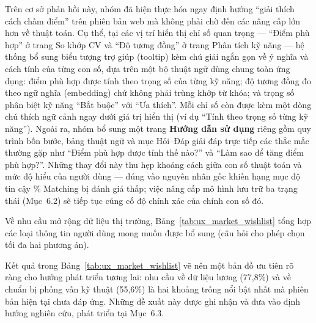 Trên cơ sở phản hồi này, nhóm đã hiện thực hóa ngay định hướng ``giải thích cách chấm điểm'' trên phiên bản web mà không phải chờ đến các nâng cấp lớn hơn về thuật toán. Cụ thể, tại các vị trí hiển thị chỉ số quan trọng --- ``Điểm phù hợp'' ở trang So khớp CV và ``Độ tương đồng'' ở trang Phân tích kỹ năng --- hệ thống bổ sung biểu tượng trợ giúp (tooltip) kèm chú giải ngắn gọn về ý nghĩa và cách tính của từng con số, dựa trên một bộ thuật ngữ dùng chung toàn ứng dụng: điểm phù hợp được tính theo trọng số của từng kỹ năng; độ tương đồng đo theo ngữ nghĩa (embedding) chứ không phải trùng khớp từ khóa; và trọng số phân biệt kỹ năng ``Bắt buộc'' với ``Ưa thích''. Mỗi chỉ số còn được kèm một dòng chú thích ngữ cảnh ngay dưới giá trị hiển thị (ví dụ ``Tính theo trọng số từng kỹ năng''). Ngoài ra, nhóm bổ sung một trang \textbf{Hướng dẫn sử dụng} riêng gồm quy trình bốn bước, bảng thuật ngữ và mục Hỏi--Đáp giải đáp trực tiếp các thắc mắc thường gặp như ``Điểm phù hợp được tính thế nào?'' và ``Làm sao để tăng điểm phù hợp?''. Những thay đổi này thu hẹp khoảng cách giữa con số thuật toán và mức độ hiểu của người dùng --- đúng vào nguyên nhân gốc khiến hạng mục độ tin cậy \% Matching bị đánh giá thấp; việc nâng cấp mô hình lưu trữ ba trạng thái (Mục~6.2) sẽ tiếp tục củng cố độ chính xác của chính con số đó.

Về nhu cầu mở rộng dữ liệu thị trường, Bảng~\ref{tab:ux_market_wishlist} tổng hợp các loại thông tin người dùng mong muốn được bổ sung (câu hỏi cho phép chọn tối đa hai phương án).

\begin{table}[H]
\caption{Nhu cầu bổ sung thông tin thị trường từ phía người dùng (chọn tối đa 2, n = 9)}
\label{tab:ux_market_wishlist}
\begin{center}
\end{center}
\end{table}
Kết quả trong Bảng~\ref{tab:ux_market_wishlist} vẽ nên một bản đồ ưu tiên rõ ràng cho hướng phát triển tương lai: nhu cầu về dữ liệu lương (77,8\%) và về chuẩn bị phỏng vấn kỹ thuật (55,6\%) là hai khoảng trống nổi bật nhất mà phiên bản hiện tại chưa đáp ứng. Những đề xuất này được ghi nhận và đưa vào định hướng nghiên cứu, phát triển tại Mục~6.3.

